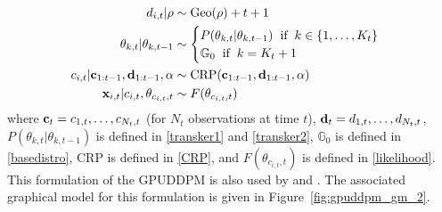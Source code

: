 \documentclass[smallcondensed, final]{svjour3}
\begin{document}
\begin{align}
\begin{split}
d_{i,t} | \rho  &\sim \text{Geo}(\rho) + t + 1 \\
\theta_{k, t} | \theta_{k, t-1}  &\sim
\begin{cases}
P(\theta_{k,t} | \theta_{k,t-1}) \hspace{2mm} \text{if} \hspace{2mm} k \in \{ 1, \ldots, K_{t} \} \\
\mathbb{G}_{0} \hspace{2mm} \text{if} \hspace{2mm} k = K_{t} + 1
\end{cases} \\
c_{i,t} | \bold{c}_{1:t-1}, \bold{d}_{1:t-1}, \alpha  &\sim  \text{CRP}(\bold{c}_{1:t-1}, \bold{d}_{1:t-1}, \alpha) \\
\bold{x}_{i,t} | c_{i,t}, \theta_{c_{i,t},t}  &\sim  F(\theta_{c_{i,t}, t})
\end{split}
\end{align}
where $\bold{c}_{t} = c_{1,t}, \ldots, c_{N_{t}, t}$ (for $N_{t}$ observations at time $t$), $\bold{d}_{t} = d_{1,t}, \ldots, d_{N_{t}, t}$, $P(\theta_{k,t} | \theta_{k,t-1})$ is defined in \eqref{transker1} and \eqref{transker2}, $\mathbb{G}_{0}$ is defined in \eqref{basedistro}, CRP is defined in \eqref{CRP}, and $F(\theta_{c_{i,t}, t})$ is defined in \eqref{likelihood}. This formulation of the GPUDDPM is also used by \cite{gasthaus_thesis} and \cite{caron_2007}. The associated graphical model for this formulation is given in Figure~\ref{fig:gpuddpm_gm_2}.
\end{document}

